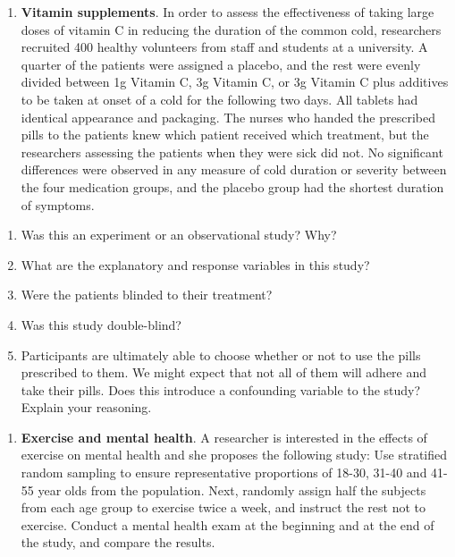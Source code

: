 \documentclass[
]{book}
\providecommand{\tightlist}{%
  \setlength{\itemsep}{0pt}\setlength{\parskip}{0pt}}
\begin{document}
\pagebreak

\begin{enumerate}
\def\labelenumi{\arabic{enumi}.}
\setcounter{enumi}{3}
\tightlist
\item
  \textbf{Vitamin supplements}. In order to assess the effectiveness of taking large doses of vitamin C in reducing the duration of the common cold, researchers recruited 400 healthy volunteers from staff and students at a university. A quarter of the patients were assigned a placebo, and the rest were evenly divided between 1g Vitamin C, 3g Vitamin C, or 3g Vitamin C plus additives to be taken at onset of a cold for the following two days. All tablets had identical appearance and packaging. The nurses who handed the prescribed pills to the patients knew which patient received which treatment, but the researchers assessing the patients when they were sick did not. No significant differences were observed in any measure of cold duration or severity between the four medication groups, and the placebo group had the shortest duration of symptoms.
\end{enumerate}

\begin{enumerate}
\def\labelenumi{\alph{enumi}.}
\tightlist
\item
  Was this an experiment or an observational study? Why?\\
\item
  What are the explanatory and response variables in this study?\\
\item
  Were the patients blinded to their treatment?\\
\item
  Was this study double-blind?\\
\item
  Participants are ultimately able to choose whether or not to use the pills prescribed to them. We might expect that not all of them will adhere and take their pills. Does this introduce a confounding variable to the study? Explain your reasoning.
\end{enumerate}

\begin{enumerate}
\def\labelenumi{\arabic{enumi}.}
\setcounter{enumi}{4}
\tightlist
\item
  \textbf{Exercise and mental health}. A researcher is interested in the effects of exercise on mental health and she proposes the following study: Use stratified random sampling to ensure representative proportions of 18-30, 31-40 and 41-55 year olds from the population. Next, randomly assign half the subjects from each age group to exercise twice a week, and instruct the rest not to exercise. Conduct a mental health exam at the beginning and at the end of the study, and compare the results.
\end{enumerate}
\end{document}
